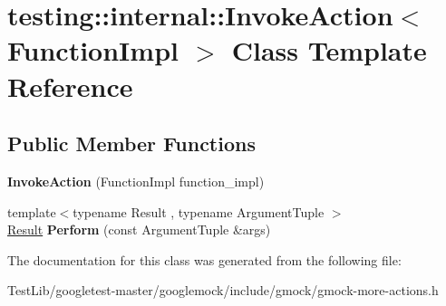 \hypertarget{classtesting_1_1internal_1_1InvokeAction}{}\section{testing\+:\+:internal\+:\+:Invoke\+Action$<$ Function\+Impl $>$ Class Template Reference}
\label{classtesting_1_1internal_1_1InvokeAction}
\subsection*{Public Member Functions}
\begin{DoxyCompactItemize}
\item 
\mbox{\label{classtesting_1_1internal_1_1InvokeAction_a786ce772624fc87a31891f465df7ce61}} 
{\bfseries Invoke\+Action} (Function\+Impl function\+\_\+impl)
\item 
\mbox{\label{classtesting_1_1internal_1_1InvokeAction_af357ce691795b3520de1fda4ab8af8b2}} 
{\footnotesize template$<$typename Result , typename Argument\+Tuple $>$ }\\\hyperlink{classResult}{Result} {\bfseries Perform} (const Argument\+Tuple \&args)
\end{DoxyCompactItemize}


The documentation for this class was generated from the following file\+:\begin{DoxyCompactItemize}
\item 
Test\+Lib/googletest-\/master/googlemock/include/gmock/gmock-\/more-\/actions.\+h\end{DoxyCompactItemize}
